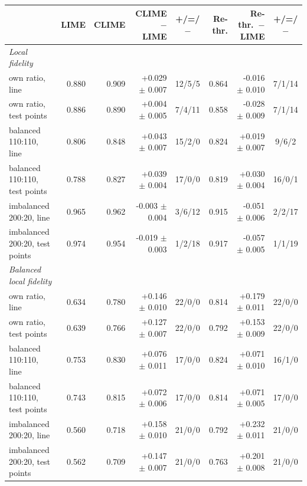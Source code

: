 \begin{tabular}{@{}lrrrcrrc@{}}
  \toprule
   & LIME & CLIME & CLIME $-$ LIME & +/=/$-$ & Re-thr. & Re-thr.\ $-$ LIME & +/=/$-$ \\
  \midrule
  \emph{Local fidelity} &  &  &  &  &  &  &  \\
  own ratio, line & 0.880 & 0.909 & +0.029 $\pm$ 0.007 & 12/5/5 & 0.864 & -0.016 $\pm$ 0.010 & 7/1/14 \\
  own ratio, test points & 0.886 & 0.890 & +0.004 $\pm$ 0.005 & 7/4/11 & 0.858 & -0.028 $\pm$ 0.009 & 7/1/14 \\
  balanced 110:110, line & 0.806 & 0.848 & +0.043 $\pm$ 0.007 & 15/2/0 & 0.824 & +0.019 $\pm$ 0.007 & 9/6/2 \\
  balanced 110:110, test points & 0.788 & 0.827 & +0.039 $\pm$ 0.004 & 17/0/0 & 0.819 & +0.030 $\pm$ 0.004 & 16/0/1 \\
  imbalanced 200:20, line & 0.965 & 0.962 & -0.003 $\pm$ 0.004 & 3/6/12 & 0.915 & -0.051 $\pm$ 0.006 & 2/2/17 \\
  imbalanced 200:20, test points & 0.974 & 0.954 & -0.019 $\pm$ 0.003 & 1/2/18 & 0.917 & -0.057 $\pm$ 0.005 & 1/1/19 \\
  \midrule
  \emph{Balanced local fidelity} &  &  &  &  &  &  &  \\
  own ratio, line & 0.634 & 0.780 & +0.146 $\pm$ 0.010 & 22/0/0 & 0.814 & +0.179 $\pm$ 0.011 & 22/0/0 \\
  own ratio, test points & 0.639 & 0.766 & +0.127 $\pm$ 0.007 & 22/0/0 & 0.792 & +0.153 $\pm$ 0.009 & 22/0/0 \\
  balanced 110:110, line & 0.753 & 0.830 & +0.076 $\pm$ 0.011 & 17/0/0 & 0.824 & +0.071 $\pm$ 0.010 & 16/1/0 \\
  balanced 110:110, test points & 0.743 & 0.815 & +0.072 $\pm$ 0.006 & 17/0/0 & 0.814 & +0.071 $\pm$ 0.005 & 17/0/0 \\
  imbalanced 200:20, line & 0.560 & 0.718 & +0.158 $\pm$ 0.010 & 21/0/0 & 0.792 & +0.232 $\pm$ 0.011 & 21/0/0 \\
  imbalanced 200:20, test points & 0.562 & 0.709 & +0.147 $\pm$ 0.007 & 21/0/0 & 0.763 & +0.201 $\pm$ 0.008 & 21/0/0 \\
  \bottomrule
\end{tabular}

